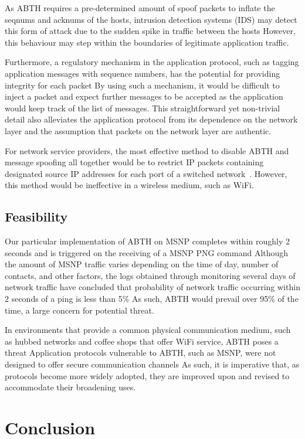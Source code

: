 \documentclass{sig-alternate}
\begin{document}
As ABTH requires a pre-determined amount of spoof packets to inflate the seqnums and acknums of the hosts, intrusion detection systems (IDS) may detect this form of attack due to the sudden spike in traffic between the hosts
However, this behaviour may step within the boundaries of legitimate application traffic.

Furthermore, a regulatory mechanism in the application protocol, such as tagging application messages with sequence numbers, has the potential for providing integrity for each packet
By using such a mechanism, it would be difficult to inject a packet and expect further messages to be accepted as the application would keep track of the list of messages.
This straightforward yet non-trivial detail also alleviates the application protocol from its dependence on the network layer and the assumption that packets on the network layer are authentic.

For network service providers, the most effective method to disable ABTH and message spoofing all together would be to restrict IP packets containing designated source IP addresses for each port of a switched network~\cite{templeton:spoof}.
However, this method would be ineffective in a wireless medium, such as WiFi.

\subsection{Feasibility}

Our particular implementation of ABTH on MSNP completes within roughly 2 seconds and is triggered on the receiving of a MSNP PNG command
Although the amount of MSNP traffic varies depending on the time of day, number of contacts, and other factors, the logs obtained through monitoring several days of network traffic have concluded that probability of network traffic occurring within 2 seconds of a ping is less than 5\%
As such, ABTH would prevail over 95\% of the time, a large concern for potential threat.

In environments that provide a common physical communication medium, such as hubbed networks and coffee shops that offer WiFi service, ABTH poses a threat
Application protocols vulnerable to ABTH, such as MSNP, were not designed to offer secure communication channels
As such, it is imperative that, as protocols become more widely adopted, they are improved upon and revised to accommodate their broadening uses.

\section{Conclusion}
\end{document}
